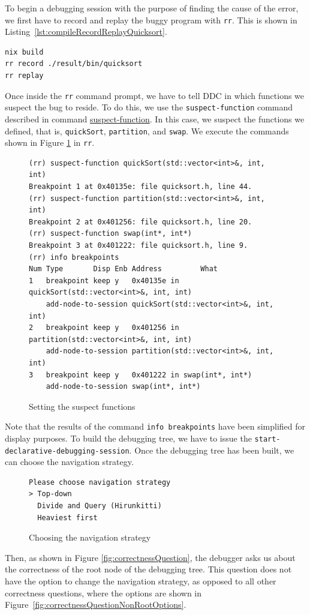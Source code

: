 To begin a debugging session with the purpose of finding the cause of the error, we first have to record and replay the buggy program with \verb|rr|. This is shown in
Listing~\ref{lst:compileRecordReplayQuicksort}.
\begin{lstlisting}[language=bash, caption={Compiling, recording and replaying quickSort}, frame=tb, label={lst:compileRecordReplayQuicksort}]
nix build
rr record ./result/bin/quicksort
rr replay
\end{lstlisting}
Once inside the \verb|rr| command prompt, we have to tell DDC in which functions we suspect the bug to reside.
To do this, we use the \verb|suspect-function| command described in command \hyperref[command:suspect-function]{suspect-function}. In this case, we suspect the functions we defined, that is, \verb|quickSort|, \verb|partition|, and \verb|swap|. We execute the commands shown in Figure \ref{fig:suspecting-functions} in \verb|rr|.
\begin{figure}
    \centering
    \caption{Setting the suspect functions}
    \label{fig:suspecting-functions}
    \begin{verbatim}
(rr) suspect-function quickSort(std::vector<int>&, int, int)
Breakpoint 1 at 0x40135e: file quicksort.h, line 44.
(rr) suspect-function partition(std::vector<int>&, int, int)
Breakpoint 2 at 0x401256: file quicksort.h, line 20.
(rr) suspect-function swap(int*, int*)
Breakpoint 3 at 0x401222: file quicksort.h, line 9.
(rr) info breakpoints
Num Type       Disp Enb Address         What
1   breakpoint keep y   0x40135e in quickSort(std::vector<int>&, int, int)
    add-node-to-session quickSort(std::vector<int>&, int, int)
2   breakpoint keep y   0x401256 in partition(std::vector<int>&, int, int)
    add-node-to-session partition(std::vector<int>&, int, int)
3   breakpoint keep y   0x401222 in swap(int*, int*)
    add-node-to-session swap(int*, int*)
    \end{verbatim}
\end{figure}
Note that the results of the command \verb|info breakpoints| have been simplified for display purposes.
To build the debugging tree, we have to issue the \verb|start-declarative-debugging-session|.
Once the debugging tree has been built, we can choose the navigation strategy.
\begin{figure}
    \centering
    \caption{Choosing the navigation strategy}
    \label{fig:navigationsStrategyPrompt}
    \begin{verbatim}
Please choose navigation strategy
> Top-down
  Divide and Query (Hirunkitti)
  Heaviest first
    \end{verbatim}
\end{figure}
Then, as shown in Figure \ref{fig:correctnessQuestion}, the debugger asks us about the correctness of the root node of the debugging tree. This question does not have the option to change the navigation strategy, as opposed to all other correctness questions, where the options are shown in Figure~\ref{fig:correctnessQuestionNonRootOptions}.


